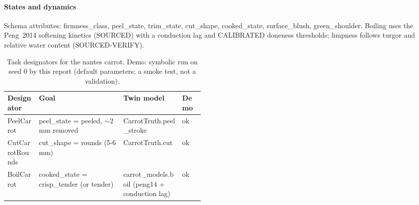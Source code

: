 \documentclass[10.5pt,a4paper]{article}
\begin{document}
\paragraph{States and dynamics} Schema attributes: firmness\_class, peel\_state, trim\_state, cut\_shape, cooked\_state, surface\_blush, green\_shoulder. Boiling uses the Peng~2014 softening kinetics (SOURCED) with a conduction lag and CALIBRATED doneness
thresholds; limpness follows turgor and relative water content (SOURCED-VERIFY).\begin{table}[htbp]\centering\scriptsize\caption{Task designators for the nantes carrot. Demo: symbolic run on seed 0 by this report (default parameters; a smoke test, not a validation).}
\begin{tabularx}{\linewidth}{@{}p{0.16\linewidth}Xp{0.3\linewidth}l@{}}\toprule Designator & Goal & Twin model & Demo \\\midrule
PeelCarrot & peel\_state = peeled, $\sim$2 mm removed & CarrotTruth.peel\_stroke & ok \\
CutCarrotRounds & cut\_shape = rounds (5-6 mm) & CarrotTruth.cut & ok \\
BoilCarrot & cooked\_state = crisp\_tender (or tender) & carrot\_models.boil (peng14 + conduction lag) & ok \\\bottomrule\end{tabularx}\end{table}
\end{document}
